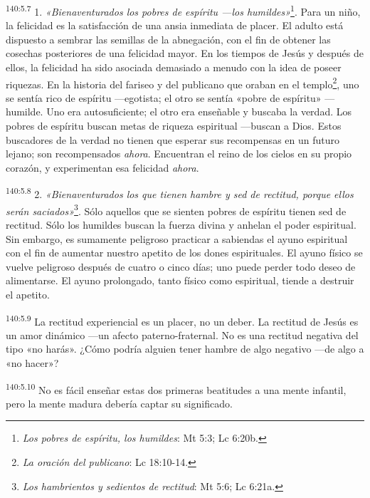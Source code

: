 \par 
\textsuperscript{140:5.7} 1. \textit{«Bienaventurados los pobres de espíritu ---los humildes»}\footnote{\textit{Los pobres de espíritu, los humildes}: Mt 5:3; Lc 6:20b.}. Para un niño, la felicidad es la satisfacción de una ansia inmediata de placer. El adulto está dispuesto a sembrar las semillas de la abnegación, con el fin de obtener las cosechas posteriores de una felicidad mayor. En los tiempos de Jesús y después de ellos, la felicidad ha sido asociada demasiado a menudo con la idea de poseer riquezas. En la historia del fariseo y del publicano que oraban en el templo\footnote{\textit{La oración del publicano}: Lc 18:10-14.}, uno se sentía rico de espíritu ---egotista; el otro se sentía «pobre de espíritu» ---humilde. Uno era autosuficiente; el otro era enseñable y buscaba la verdad. Los pobres de espíritu buscan metas de riqueza espiritual ---buscan a Dios. Estos buscadores de la verdad no tienen que esperar sus recompensas en un futuro lejano; son recompensados \textit{ahora}. Encuentran el reino de los cielos en su propio corazón, y experimentan esa felicidad \textit{ahora}.

\par 
\textsuperscript{140:5.8} 2. \textit{«Bienaventurados los que tienen hambre y sed de rectitud, porque ellos serán saciados»}\footnote{\textit{Los hambrientos y sedientos de rectitud}: Mt 5:6; Lc 6:21a.}. Sólo aquellos que se sienten pobres de espíritu tienen sed de rectitud. Sólo los humildes buscan la fuerza divina y anhelan el poder espiritual. Sin embargo, es sumamente peligroso practicar a sabiendas el ayuno espiritual con el fin de aumentar nuestro apetito de los dones espirituales. El ayuno físico se vuelve peligroso después de cuatro o cinco días; uno puede perder todo deseo de alimentarse. El ayuno prolongado, tanto físico como espiritual, tiende a destruir el apetito.

\par 
\textsuperscript{140:5.9} La rectitud experiencial es un placer, no un deber. La rectitud de Jesús es un amor dinámico ---un afecto paterno-fraternal. No es una rectitud negativa del tipo «no harás». ¿Cómo podría alguien tener hambre de algo negativo ---de algo a «no hacer»?

\par 
\textsuperscript{140:5.10} No es fácil enseñar estas dos primeras beatitudes a una mente infantil, pero la mente madura debería captar su significado.

